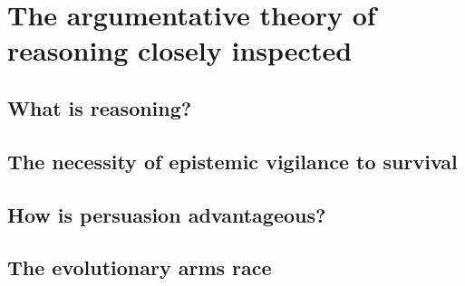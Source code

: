 \chapter{The argumentative theory of reasoning closely inspected}
\label{ch:scrutiny}

\section{What is reasoning?}

\section{The necessity of epistemic vigilance to survival}

\section{How is persuasion advantageous?}

\section{The evolutionary arms race}
